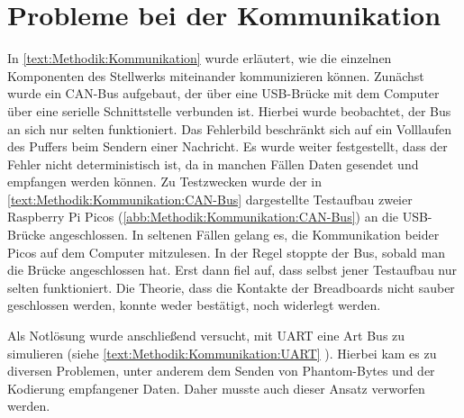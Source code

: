 \section{Probleme bei der Kommunikation}\label{text:Entwicklung-des-Stellwerks:Probleme-bei-der-Kommunikation}

In \autoref{text:Methodik:Kommunikation}  wurde erläutert, wie die einzelnen Komponenten des Stellwerks miteinander kommunizieren können. Zunächst wurde ein CAN-Bus aufgebaut, der über eine USB-Brücke mit dem Computer über eine serielle Schnittstelle verbunden ist. Hierbei wurde beobachtet, der Bus an sich nur selten funktioniert. Das Fehlerbild beschränkt sich auf ein Volllaufen des Puffers beim Sendern einer Nachricht. Es wurde weiter festgestellt, dass der Fehler nicht deterministisch ist, da in manchen Fällen Daten gesendet und empfangen werden können.
Zu Testzwecken wurde der in \autoref{text:Methodik:Kommunikation:CAN-Bus}  dargestellte Testaufbau zweier Raspberry Pi Picos (\autoref{abb:Methodik:Kommunikation:CAN-Bus}) an die USB-Brücke angeschlossen. In seltenen Fällen gelang es, die Kommunikation beider Picos auf dem Computer mitzulesen. In der Regel stoppte der Bus, sobald man die Brücke angeschlossen hat.
Erst dann fiel auf, dass selbst jener Testaufbau nur selten funktioniert. Die Theorie, dass die Kontakte der Breadboards nicht sauber geschlossen werden, konnte weder bestätigt, noch widerlegt werden.

Als Notlösung wurde anschließend versucht, mit UART eine Art Bus zu simulieren (siehe \autoref{text:Methodik:Kommunikation:UART} ). Hierbei kam es zu diversen Problemen, unter anderem dem Senden von Phantom-Bytes und der Kodierung empfangener Daten. Daher musste auch dieser Ansatz verworfen werden.
